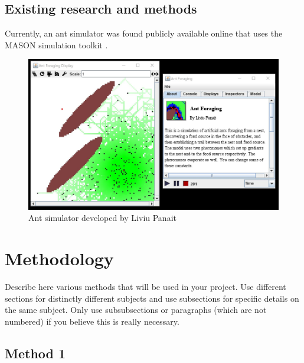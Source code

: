 \documentclass[a4paper, oneside, 11pt]{report}
\begin{document}
\section{Existing research and methods}
Currently, an ant simulator was found publicly available online that uses the MASON simulation toolkit \citep{Mason}.

\begin{figure}[htb]
	\includegraphics[width=1.0 \columnwidth]{MASON_Ant.jpg}
	\caption{Ant simulator developed by Liviu Panait}
	\label{MASON_Ant}
\end{figure}

\chapter{Methodology}

Describe here various methods that will be used in your project. Use different sections for distinctly different subjects and use subsections for specific details on the same subject. Only use subsubsections or paragraphs (which are not numbered) if you believe this is really necessary. 

\section{Method 1}
\end{document}
